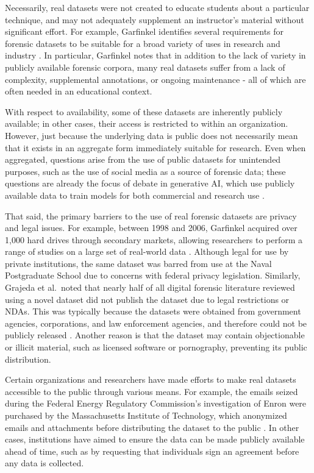 Necessarily, real datasets were not created to educate students about a
particular technique, and may not adequately supplement an instructor's
material without significant effort. For example, Garfinkel identifies
several requirements for forensic datasets to be suitable for a broad
variety of uses in research and industry
\cite{garfinkelForensicCorporaChallenge2007}. In particular,
Garfinkel notes that in addition to the lack of variety in publicly
available forensic corpora, many real datasets suffer from a lack of
complexity, supplemental annotations, or ongoing maintenance - all of
which are often needed in an educational context.

With respect to availability, some of these datasets are inherently
publicly available; in other cases, their access is restricted to within
an organization. However, just because the underlying data is public
does not necessarily mean that it exists in an aggregate form
immediately suitable for research. Even when aggregated, questions arise
from the use of public datasets for unintended purposes, such as the use
of social media as a source of forensic data; these questions are
already the focus of debate in generative AI, which use publicly
available data to train models for both commercial and research use
\cite{avrahamiOwnershipCreativityGenerative2021,eshraghianHumanOwnershipArtificial2020,rooseAIgeneratedPictureWon2022}.

That said, the primary barriers to the use of real forensic datasets are
privacy and legal issues. For example, between 1998 and 2006, Garfinkel
acquired over 1,000 hard drives through secondary markets, allowing
researchers to perform a range of studies on a large set of real-world
data \cite{garfinkelForensicCorporaChallenge2007}. Although legal
for use by private institutions, the same dataset was barred from use at
the Naval Postgraduate School due to concerns with federal privacy
legislation. Similarly, Grajeda et al.~noted that nearly half of all
digital forensic literature reviewed using a novel dataset did not
publish the dataset due to legal restrictions or NDAs. This was
typically because the datasets were obtained from government agencies,
corporations, and law enforcement agencies, and therefore could not be
publicly released \cite{grajedaAvailabilityDatasetsDigital2017}.
Another reason is that the dataset may contain objectionable or illicit
material, such as licensed software or pornography, preventing its
public distribution.

Certain organizations and researchers have made efforts to make real
datasets accessible to the public through various means. For example,
the emails seized during the Federal Energy Regulatory Commission's
investigation of Enron were purchased by the Massachusetts Institute of
Technology, which anonymized emails and attachments before distributing
the dataset to the public
\cite{yannikosDataCorporaDigital2014,garfinkelForensicCorporaChallenge2007}.
In other cases, institutions have aimed to ensure the data can be made
publicly available ahead of time, such as by requesting that individuals
sign an agreement before any data is collected.

